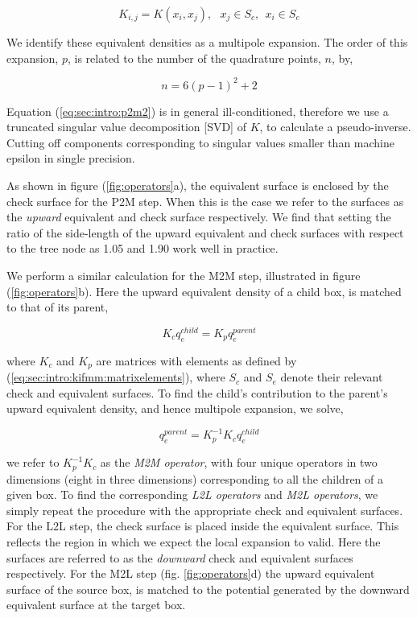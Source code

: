 \documentclass{IEEEcsmag}
\begin{document}
\begin{equation}
	K_{i, j} = K(x_i, x_j), \> \> \> x_j \in S_c, \> \> x_i \in S_e
	\label{eq:sec:intro:kifmm:matrixelements}
\end{equation}

We identify these equivalent densities as a multipole expansion. The order of this expansion, $p$, is related to the number of the quadrature points, $n$, by,

\begin{equation}
	n = 6(p-1)^2+2
	\label{eq:sec:intro:kifmm:nquads}
\end{equation}

Equation (\ref{eq:sec:intro:p2m2}) is in general ill-conditioned, therefore we use a truncated singular value decomposition [SVD] of $K$, to calculate a pseudo-inverse. Cutting off components corresponding to singular values smaller than machine epsilon in single precision.

As shown in figure (\ref{fig:operators}a), the equivalent surface is enclosed by the check surface for the P2M step. When this is the case we refer to the surfaces as the \textit{upward} equivalent and check surface respectively. We find that setting the ratio of the side-length of the upward equivalent and check surfaces with respect to the tree node as 1.05 and 1.90 work well in practice.

We perform a similar calculation for the M2M step, illustrated in figure (\ref{fig:operators}b). Here the upward equivalent density of a child box, is matched to that of its parent,

\begin{equation}
	K_c q_e^{child} = K_p q_e ^{parent}
\end{equation}

where $K_c$ and $K_p$ are matrices with elements as defined by (\ref{eq:sec:intro:kifmm:matrixelements}), where $S_c$ and $S_e$ denote their relevant check and equivalent surfaces. To find the child's contribution to the parent's upward equivalent density, and hence multipole expansion, we solve,

\begin{equation}
	q_e^{parent} = K_p^{-1}K_c q_e^{child}
\end{equation}

we refer to $K_p^{-1}K_c$ as the \textit{M2M operator}, with four unique operators in two dimensions (eight in three dimensions) corresponding to all the children of a given box. To find the corresponding \textit{L2L operators} and \textit{M2L operators}, we simply repeat the procedure with the appropriate check and equivalent surfaces. For the L2L step, the check surface is placed inside the equivalent surface. This reflects the region in which we expect the local expansion to valid. Here the surfaces are referred to as the \textit{downward} check and equivalent surfaces respectively. For the M2L step (fig. \ref{fig:operators}d) the upward equivalent surface of the source box, is matched to the potential generated by the downward equivalent surface at the target box.
\end{document}
